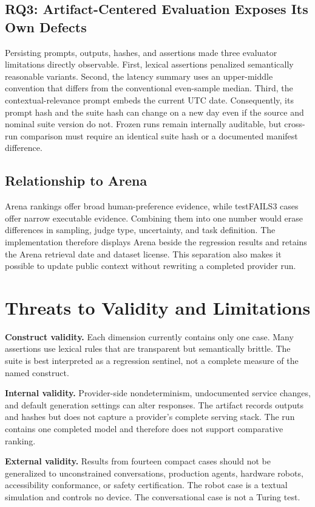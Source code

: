 \documentclass[10pt,twocolumn]{article}
\newcommand{\system}{testFAILS3}
\begin{document}
\subsection{RQ3: Artifact-Centered Evaluation Exposes Its Own Defects}
Persisting prompts, outputs, hashes, and assertions made three evaluator limitations directly observable. First, lexical assertions penalized semantically reasonable variants. Second, the latency summary uses an upper-middle convention that differs from the conventional even-sample median. Third, the contextual-relevance prompt embeds the current UTC date. Consequently, its prompt hash and the suite hash can change on a new day even if the source and nominal suite version do not. Frozen runs remain internally auditable, but cross-run comparison must require an identical suite hash or a documented manifest difference.

\subsection{Relationship to Arena}
Arena rankings offer broad human-preference evidence, while \system{} cases offer narrow executable evidence. Combining them into one number would erase differences in sampling, judge type, uncertainty, and task definition. The implementation therefore displays Arena beside the regression results and retains the Arena retrieval date and dataset license. This separation also makes it possible to update public context without rewriting a completed provider run.

\section{Threats to Validity and Limitations}
\textbf{Construct validity.} Each dimension currently contains only one case. Many assertions use lexical rules that are transparent but semantically brittle. The suite is best interpreted as a regression sentinel, not a complete measure of the named construct.

\textbf{Internal validity.} Provider-side nondeterminism, undocumented service changes, and default generation settings can alter responses. The artifact records outputs and hashes but does not capture a provider's complete serving stack. The run contains one completed model and therefore does not support comparative ranking.

\textbf{External validity.} Results from fourteen compact cases should not be generalized to unconstrained conversations, production agents, hardware robots, accessibility conformance, or safety certification. The robot case is a textual simulation and controls no device. The conversational case is not a Turing test.
\end{document}
